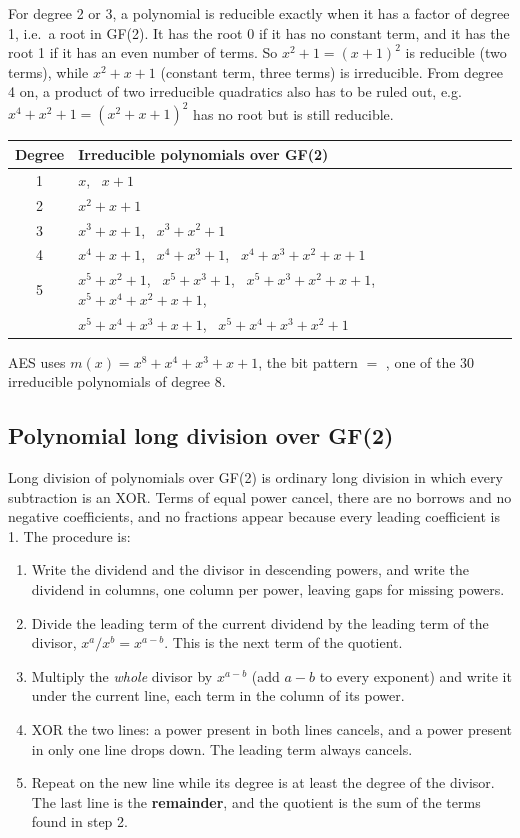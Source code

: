 For degree 2 or 3, a polynomial is reducible exactly when it has a factor of degree 1, i.e.\ a root in GF(2). It has the root 0 if it has no constant term, and it has the root 1 if it has an even number of terms. So $x^2 + 1 = (x + 1)^2$ is reducible (two terms), while $x^2 + x + 1$ (constant term, three terms) is irreducible. From degree 4 on, a product of two irreducible quadratics also has to be ruled out, e.g.\ $x^4 + x^2 + 1 = (x^2 + x + 1)^2$ has no root but is still reducible.
\begin{center}\small
\begin{tabular}{@{}cl@{}}
\toprule
Degree & Irreducible polynomials over GF(2)\\
\midrule
1 & $x$, \ $x + 1$\\
2 & $x^2 + x + 1$\\
3 & $x^3 + x + 1$, \ $x^3 + x^2 + 1$\\
4 & $x^4 + x + 1$, \ $x^4 + x^3 + 1$, \ $x^4 + x^3 + x^2 + x + 1$\\
5 & $x^5 + x^2 + 1$, \ $x^5 + x^3 + 1$, \ $x^5 + x^3 + x^2 + x + 1$, \ $x^5 + x^4 + x^2 + x + 1$,\\
  & $x^5 + x^4 + x^3 + x + 1$, \ $x^5 + x^4 + x^3 + x^2 + 1$\\
\bottomrule
\end{tabular}
\end{center}
AES uses $\boxed{m(x) = x^8 + x^4 + x^3 + x + 1}$, the bit pattern  $=$ , one of the 30 irreducible polynomials of degree 8.

\subsection{Polynomial long division over GF(2) \hot}
Long division of polynomials over GF(2) is ordinary long division in which every subtraction is an XOR. Terms of equal power cancel, there are no borrows and no negative coefficients, and no fractions appear because every leading coefficient is 1. The procedure is:
\begin{enumerate}[nosep]
  \item Write the dividend and the divisor in descending powers, and write the dividend in columns, one column per power, leaving gaps for missing powers.
  \item Divide the leading term of the current dividend by the leading term of the divisor, $x^a / x^b = x^{a-b}$. This is the next term of the quotient.
  \item Multiply the \emph{whole} divisor by $x^{a-b}$ (add $a - b$ to every exponent) and write it under the current line, each term in the column of its power.
  \item XOR the two lines: a power present in both lines cancels, and a power present in only one line drops down. The leading term always cancels.
  \item Repeat on the new line while its degree is at least the degree of the divisor. The last line is the \textbf{remainder}, and the quotient is the sum of the terms found in step 2.
\end{enumerate}

